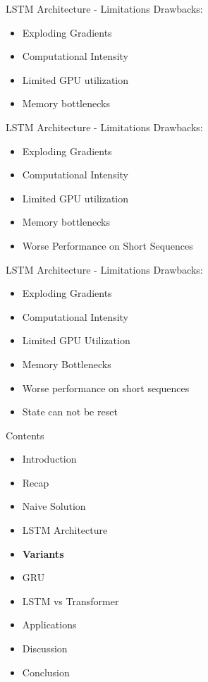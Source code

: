 \documentclass[10pt, aspectratio=169]{beamer}
\begin{document}
\begin{frame}[t]{LSTM Architecture - Limitations}
Drawbacks:
\begin{itemize}
    \item Exploding Gradients
    \item Computational Intensity
    \item Limited GPU utilization
    \item Memory bottlenecks
\end{itemize}
\end{frame}

\begin{frame}[t]{LSTM Architecture - Limitations}
Drawbacks:
\begin{itemize}
    \item Exploding Gradients
    \item Computational Intensity
    \item Limited GPU utilization
    \item Memory bottlenecks
    \item Worse Performance on Short Sequences
\end{itemize}
\end{frame}

\begin{frame}[t]{LSTM Architecture - Limitations}
Drawbacks:
\begin{itemize}
    \item Exploding Gradients
    \item Computational Intensity
    \item Limited GPU Utilization
    \item Memory Bottlenecks
    \item Worse performance on short sequences
    \item State can not be reset
\end{itemize}
\end{frame}


\begin{frame}[t]{Contents}
\begin{itemize}
    \item Introduction
    \item Recap
    \item Naive Solution
    \item LSTM Architecture
    \item \textbf{Variants}
    \item GRU
    \item LSTM vs Transformer
    \item Applications
    \item Discussion
    \item Conclusion
\end{itemize}
\end{frame}
\end{document}
